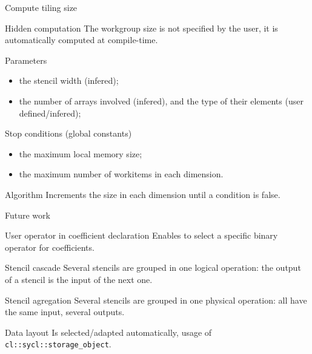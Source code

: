 \documentclass[10pt, compress]{beamer}
\begin{document}
\begin{frame}{Compute tiling size}

\begin{block}{Hidden computation}
The \alert{workgroup size} is not specified by the user, it is automatically computed at compile-time.
\end{block}

\begin{block}{Parameters}
\begin{itemize}
\item the stencil width (infered);
\item the number of arrays involved (infered), and the type of their elements (user defined/infered);
\end{itemize}
\end{block}

\begin{block}{Stop conditions (global constants)}
\begin{itemize}
\item the maximum local memory size;
\item the maximum number of workitems in each dimension.
\end{itemize}
\end{block}

\begin{block}{Algorithm}
Increments the size in each dimension until a condition is false.
\end{block}

\end{frame}

\begin{frame}[fragile]{Future work}

\begin{block}{User operator in coefficient declaration}
Enables to select a specific binary operator for coefficients.
\end{block}

\begin{block}{Stencil cascade}
Several stencils are grouped in one logical operation: the output of a stencil is the input of the next one.
\end{block}

\begin{block}{Stencil agregation}
Several stencils are grouped in one physical operation: all have the same input, several outputs.
\end{block}

\begin{block}{Data layout}
Is selected/adapted automatically, usage of \verb!cl::sycl::storage_object!.
\end{block}

\end{frame}
\end{document}
